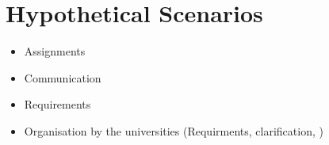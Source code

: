 
\section{Hypothetical Scenarios}

	\begin{itemize}

		\item Assignments
		\item Communication
		\item Requirements
		\item Organisation by the universities (Requirments, clarification, )
	\end{itemize}
